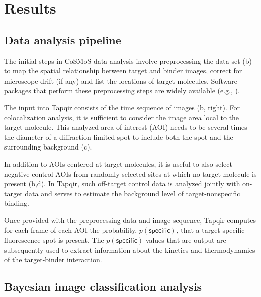 \section{Results}

\subsection{Data analysis pipeline}

The initial steps in CoSMoS data analysis involve preprocessing the data set (b) to map the spatial relationship between target and binder images, correct for microscope drift (if any) and list the locations of target molecules. Software packages that perform these preprocessing steps are widely available (e.g., \citep{Friedman2015-nx, Smith2019-yb}).

The input into Tapqir consists of the time sequence of images (b, right). For colocalization analysis, it is sufficient to consider the image area local to the target molecule. This analyzed area of interest (AOI) needs to be several times the diameter of a diffraction-limited spot to include both the spot and the surrounding background (c). 

In addition to AOIs centered at target molecules, it is useful to also select negative control AOIs from randomly selected sites at which no target molecule is present (b,d). In Tapqir, such off-target control data is analyzed jointly with on-target data and serves to estimate the background level of target-nonspecific binding. 

Once provided with the preprocessing data and image sequence, Tapqir computes for each frame of each AOI the  probability, $p(\mathsf{specific})$, that a target-specific fluorescence spot is present.   The $p(\mathsf{specific})$ values that are output are subsequently used to extract information about the kinetics and thermodynamics of the target-binder interaction.

\subsection{Bayesian image classification analysis}


